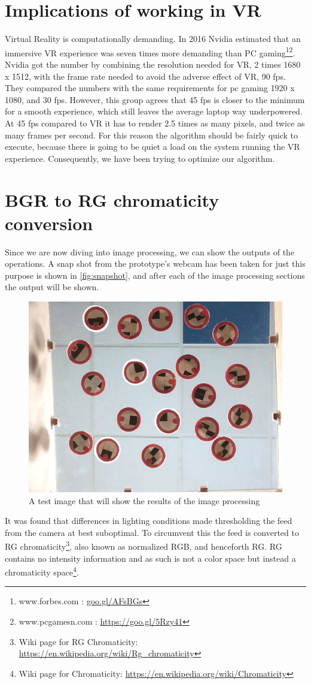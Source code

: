\section{Implications of working in VR}
Virtual Reality is computationally demanding. In 2016 Nvidia estimated that an immersive VR experience was seven times more demanding than PC gaming\footnote{www.forbes.com : \url{goo.gl/AFsBGs}}\footnote{www.pcgamesn.com : \url{https://goo.gl/5Rzy41}}. Nvidia got the number by combining the resolution needed for VR, 2 times 1680 x 1512, with the frame rate needed to avoid the adverse effect of VR, 90 fps. They compared the numbers with the same requirements for pc gaming 1920 x 1080, and 30 fps. However, this group agrees that 45 fps is closer to the minimum for a smooth experience, which still leaves the average laptop way underpowered. At 45 fps compared to VR it has to render 2.5 times as many pixels, and twice as many frames per second.
For this reason the algorithm should be fairly quick to execute, because there is going to be quiet a load on the system running the VR experience. Consequently, we have been trying to optimize our algorithm.

\section{BGR to RG chromaticity conversion}
Since we are now diving into image processing, we can show the outputs of the operations. A snap shot from the prototype's webcam has been taken for just this purpose is shown in \autoref{fig:snapshot}, and after each of the image processing sections the output will be shown.
\begin{figure}[H]
\centering
\includegraphics[width=0.6\linewidth]{figure/Analysis/testimage.jpg}
\caption{A test image that will show the results of the image processing}
\label{fig:snapshot}
\end{figure} 
It was found that differences in lighting conditions made thresholding the feed from the camera at best suboptimal. To circumvent this the feed is converted to RG chromaticity\footnote{Wiki page for RG Chromaticity: \url{https://en.wikipedia.org/wiki/Rg_chromaticity}}, also known as normalized RGB, and henceforth RG. RG contains no intensity information and as such is not a color space but instead a chromaticity space\footnote{Wiki page for Chromaticity: \url{https://en.wikipedia.org/wiki/Chromaticity}}.
